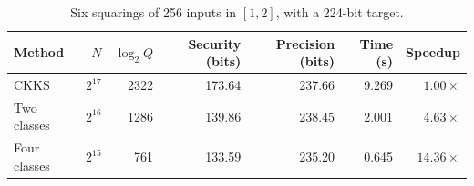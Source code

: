 \begin{table}[H]
\centering
\caption{Six squarings of 256 inputs in \([1,2]\), with a 224-bit target.}
\label{tab:exp-resources}
\setlength{\tabcolsep}{4pt}
\renewcommand{\arraystretch}{1.08}
\begin{tabular}{@{}lrrrrrr@{}}
\toprule
Method & \(N\) & \(\log_2 Q\) & Security (bits)
       & Precision (bits) & Time (s) & Speedup\\
\midrule
CKKS
 & \(2^{17}\) & 2322 & 173.64 & 237.66 & 9.269 & \(1.00\times\)\\
Two classes
 & \(2^{16}\) & 1286 & 139.86 & 238.45 & 2.001 & \(4.63\times\)\\
Four classes
 & \(2^{15}\) & 761 & 133.59 & 235.20 & 0.645 & \(14.36\times\)\\
\bottomrule
\end{tabular}
\end{table}
